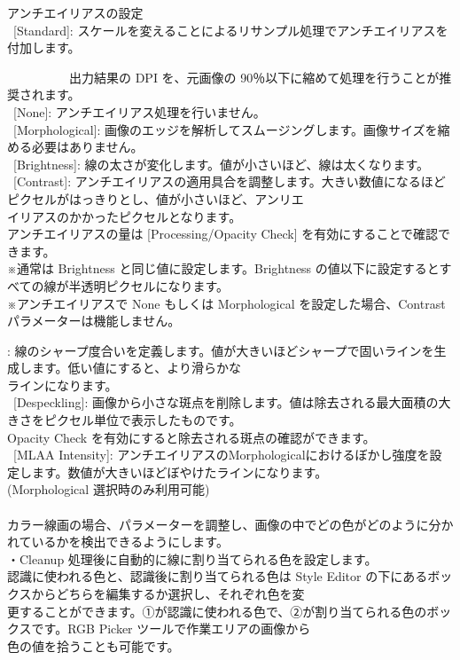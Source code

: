 \documentclass[a4paper,10pt]{article}
\begin{document}
\footnotesize
\noindent アンチエイリアスの設定\\
\ [Standard]: スケールを変えることによるリサンプル処理でアンチエイリアスを付加します。\par
\ \ \ \ \ \ \ \ \ \ 出力結果の DPI を、元画像の 90％以下に縮めて処理を行うことが推奨されます。\\
\ [None]: アンチエイリアス処理を行いません。\\
\ [Morphological]: 画像のエッジを解析してスムージングします。画像サイズを縮める必要はありません。\\
\ [Brightness]: 線の太さが変化します。値が小さいほど、線は太くなります。\\
\ [Contrast]: アンチエイリアスの適用具合を調整します。大きい数値になるほどピクセルがはっきりとし、値が小さいほど、アンリエ\\
イリアスのかかったピクセルとなります。\\
アンチエイリアスの量は [Processing/Opacity Check] を有効にすることで確認できます。\\
※通常は Brightness と同じ値に設定します。Brightness の値以下に設定するとすべての線が半透明ピクセルになります。\\
※アンチエイリアスで None もしくは Morphological を設定した場合、Contrast パラメーターは機能しません。

\newpage

\noindent [Sharpness]: 線のシャープ度合いを定義します。値が大きいほどシャープで固いラインを生成します。低い値にすると、より滑らかな\\
ラインになります。\\
\ [Despeckling]: 画像から小さな斑点を削除します。値は除去される最大面積の大きさをピクセル単位で表示したものです。\\
Opacity Check を有効にすると除去される斑点の確認ができます。\\
\ [MLAA Intensity]: アンチエイリアスのMorphologicalにおけるぼかし強度を設定します。数値が大きいほどぼやけたラインになります。\\
(Morphological 選択時のみ利用可能)\\
\\
\small
カラー線画の場合、パラメーターを調整し、画像の中でどの色がどのように分かれているかを検出できるようにします。\\
\footnotesize
・Cleanup 処理後に自動的に線に割り当てられる色を設定します。\\
認識に使われる色と、認識後に割り当てられる色は Style Editor の下にあるボックスからどちらを編集するか選択し、それぞれ色を変\\
更することができます。①が認識に使われる色で、②が割り当てられる色のボックスです。RGB Picker ツールで作業エリアの画像から\\
色の値を拾うことも可能です。
\end{document}
